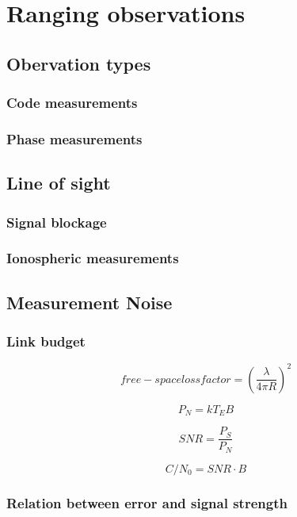 \chapter{Ranging observations}

\section{Obervation types}
\subsection{Code measurements}
\subsection{Phase measurements}


\section{Line of sight}
\subsection{Signal blockage}
\subsection{Ionospheric measurements}


\section{Measurement Noise}
\subsection{Link budget}

\begin{equation}
	free-space loss factor = \left( \frac{\lambda}{4\pi R} \right) ^2
	\label{eq:free-space_loss}
\end{equation}

\begin{equation}
	P_N = kT_EB
\end{equation}

\begin{equation}
	SNR = \frac{P_S}{P_N}
\end{equation}

\begin{equation}
	C/N_0 = SNR \cdot B
\end{equation}


\subsection{Relation between error and signal strength}
